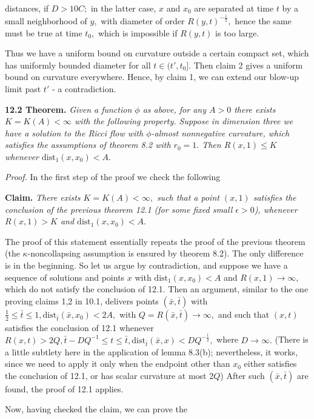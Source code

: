 \documentclass[12pt]{article}
\newcommand{\e}{\epsilon}
\newcommand{\bx}{\bar{x}}
\newcommand{\bt}{\bar{t}}
\theoremstyle{plain}
{\swapnumbers
\newtheorem{thm}{Theorem}[section]
\newtheorem{cor}[thm]{Corollary}
\newtheorem{lem}[thm]{Lemma}
\newtheorem{prop}[thm]{Proposition}
}
\theoremstyle{definition}
{\swapnumbers
\newtheorem{defn}[thm]{Definition}
\newtheorem{nota}[thm]{Notation}
\newtheorem{parag}[thm]{}
\newtheorem*{parstr}{\addtocounter{thm}{1}\thesection.\arabic{thm}*}
\newtheorem*{intropar}{\addtocounter{thm}{1}\arabic{thm}}
}
\theoremstyle{remark} {\swapnumbers
\newtheorem{rem}[thm]{Remark}
\newtheorem{exam}[thm]{Example}
\newtheorem{lemma}[thm]{Lemma}
\newtheorem{claim}[thm]{Claim}
}
\numberwithin{equation}{section}
\begin{document}
    distances, if $D>10C;$ in the latter case, $x$ and $x_0$ are
    separated at time $t$ by a small neighborhood of $y,$ with
    diameter of order $R(y,t)^{-\frac{1}{2}},$ hence the same must
    be true at time $t_0,$ which is impossible if $R(y,t)$ is too
    large.
    \par Thus we have a uniform bound on curvature  outside a certain compact set, which has uniformly
    bounded diameter for all $t\in (t',t_0].$ Then claim 2 gives a uniform bound on
    curvature everywhere. Hence, by claim 1, we can extend our
    blow-up limit past $t'$ - a contradiction. \par {\bf 12.2
    Theorem.} {\it
    Given a function $\phi$ as above, for any $A>0$ there exists
    $K=K(A)<\infty $ with the following property. Suppose in dimension three we have a solution
    to the Ricci flow with $\phi$-almost nonnegative curvature,
    which satisfies the assumptions of theorem 8.2 with $r_0=1.$
    Then $R(x,1)\le K$ whenever $\mbox{dist}_1(x,x_0)<A.$} \par
    {\it Proof.}  In the first step of the proof we check the following
    \par {\bf Claim.} {\it  There exists $K=K(A)<\infty ,$ such that a point $(x,1)$
    satisfies the conclusion of the previous theorem 12.1 (for
    some fixed small $\e>0$), whenever $R(x,1)>K$ and
    $\mbox{dist}_1(x,x_0)<A.$} \par The proof of this statement
    essentially repeats the proof of the previous theorem (the
    $\kappa$-noncollapsing assumption is ensured by theorem 8.2).
    The only difference is in the beginning. So let us argue by
    contradiction, and suppose we have a sequence of solutions and
    points $x$ with $\mbox{dist}_1(x,x_0)<A$ and
    $R(x,1)\to\infty,$ which do not satisfy the conclusion of
    12.1. Then an argument, similar to the one proving claims 1,2
    in 10.1, delivers points $(\bx,\bt)$ with $\frac{1}{2}\le
    \bt\le 1, \mbox{dist}_{\bt}(\bx,x_0)<2A,$ with
    $Q=R(\bx,\bt)\to\infty ,$ and such that $(x,t)$ satisfies the
    conclusion of 12.1 whenever $R(x,t)>2Q, \bt -DQ^{-1}\le
    t\le\bt, \mbox{dist}_{\bt}(\bx,x)<DQ^{-\frac{1}{2}},$ where
    $D\to\infty.$ (There is a little subtlety here in the
    application of lemma 8.3(b); nevertheless, it works, since we
    need to apply it only when the endpoint other than $x_0$
            either satisfies the conclusion of 12.1, or has scalar
            curvature at most $2Q$)  After such $(\bx,\bt)$ are
            found, the proof of 12.1 applies.
            \par Now, having checked the claim, we can prove the
\end{document}
